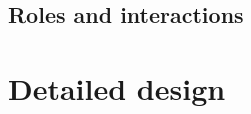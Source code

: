 \documentclass[a4paper, 11pt]{article}
\begin{document}

    \subsection{Roles and interactions}
    \section{Detailed design}
\end{document}
